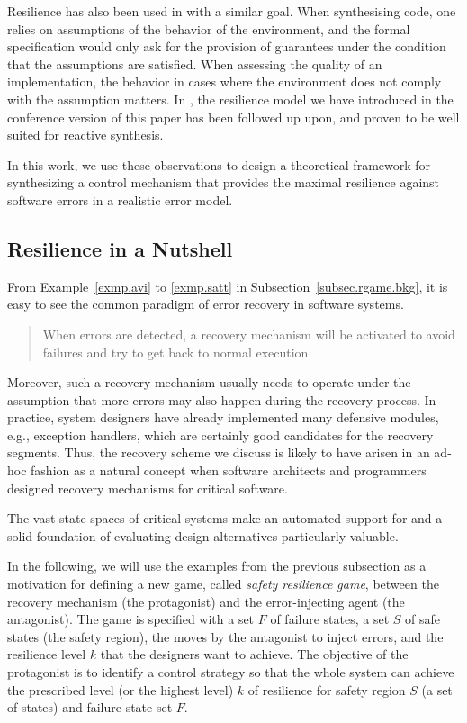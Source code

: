 Resilience has also been used in \cite{EhlersT14,BloemEJK14} with a similar goal.
When synthesising code, one relies on assumptions of the behavior of the environment, and the formal specification\label{reply1.speicification} would only ask for the provision of guarantees under the condition that the assumptions are satisfied.
When assessing the quality of an implementation, the behavior in cases\label{reply1.cases.comma} where the environment does not comply with the assumption matters.
In \cite{EhlersT14,BloemEJK14}, the resilience model we have introduced in the conference version \cite{HPSW/12/rapidRecovery} 
of this paper\label{reply1.of.this.paper}
has been followed up upon, and proven to be well suited for reactive synthesis.

In this work, we use these observations to design \label{reply1.theoretical.framework.eval} 
a theoretical framework for synthesizing a control mechanism that provides 
the maximal resilience against software errors in a realistic error model.
\subsection{Resilience in a Nutshell}
\label{reply2.from.the.examples} 
From Example~\ref{exmp.avi} to \ref{exmp.satt} in 
Subsection~\ref{subsec.rgame.bkg}, it is easy to see 
the common paradigm of error recovery in software systems.  

\begin{quote}
When errors are detected, a recovery mechanism will be activated
to avoid failures and try to get back to normal execution. 
\end{quote}

Moreover, \label{reply1.a.recovery.the.assumption}
such a recovery mechanism usually needs to operate under the assumption 
that more errors may also happen during the recovery process. In practice, system designers have already implemented many defensive modules, 
e.g., exception handlers, which are certainly good candidates for the recovery segments.  
Thus, the recovery scheme we discuss is likely to have arisen in an ad-hoc fashion as a natural concept when software architects and programmers designed recovery mechanisms for critical software.  

The vast state spaces of critical systems make an automated support for and a solid foundation 
of evaluating design alternatives particularly valuable. 

In the following, we will use the examples from the previous subsection 
as a motivation for defining a new game, called {\em safety resilience game}, 
between the recovery mechanism (the protagonist) 
and the error-injecting agent (the antagonist).  
\label{reply2.S.F}
The game is specified with a set $F$ of failure states, 
a set $S$ of safe states (the safety region), the 
moves by the antagonist to inject errors, 
and the resilience level $k$ that the designers want to achieve. 
The objective of the protagonist is to identify a control strategy 
so that the whole system can achieve the prescribed level (or 
the highest level) $k$ of resilience for safety region $S$ (a set of states) 
and failure state set $F$.  

